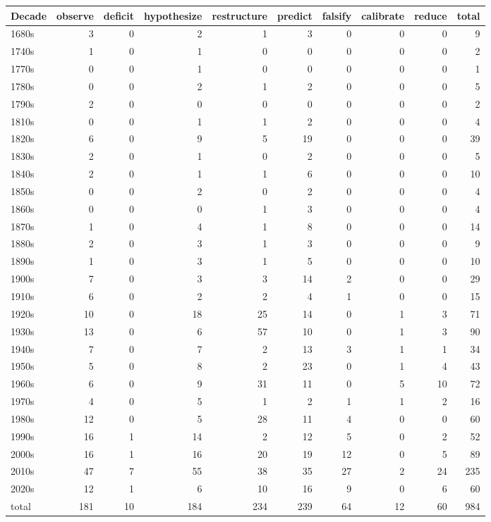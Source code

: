 \begin{tabular}{@{}lrrrrrrrrr@{}}\toprule
Decade & observe & deficit & hypothesize & restructure & predict & falsify & calibrate & reduce & total \\\midrule
1680s & 3 & 0 & 2 & 1 & 3 & 0 & 0 & 0 & 9 \\
1740s & 1 & 0 & 1 & 0 & 0 & 0 & 0 & 0 & 2 \\
1770s & 0 & 0 & 1 & 0 & 0 & 0 & 0 & 0 & 1 \\
1780s & 0 & 0 & 2 & 1 & 2 & 0 & 0 & 0 & 5 \\
1790s & 2 & 0 & 0 & 0 & 0 & 0 & 0 & 0 & 2 \\
1810s & 0 & 0 & 1 & 1 & 2 & 0 & 0 & 0 & 4 \\
1820s & 6 & 0 & 9 & 5 & 19 & 0 & 0 & 0 & 39 \\
1830s & 2 & 0 & 1 & 0 & 2 & 0 & 0 & 0 & 5 \\
1840s & 2 & 0 & 1 & 1 & 6 & 0 & 0 & 0 & 10 \\
1850s & 0 & 0 & 2 & 0 & 2 & 0 & 0 & 0 & 4 \\
1860s & 0 & 0 & 0 & 1 & 3 & 0 & 0 & 0 & 4 \\
1870s & 1 & 0 & 4 & 1 & 8 & 0 & 0 & 0 & 14 \\
1880s & 2 & 0 & 3 & 1 & 3 & 0 & 0 & 0 & 9 \\
1890s & 1 & 0 & 3 & 1 & 5 & 0 & 0 & 0 & 10 \\
1900s & 7 & 0 & 3 & 3 & 14 & 2 & 0 & 0 & 29 \\
1910s & 6 & 0 & 2 & 2 & 4 & 1 & 0 & 0 & 15 \\
1920s & 10 & 0 & 18 & 25 & 14 & 0 & 1 & 3 & 71 \\
1930s & 13 & 0 & 6 & 57 & 10 & 0 & 1 & 3 & 90 \\
1940s & 7 & 0 & 7 & 2 & 13 & 3 & 1 & 1 & 34 \\
1950s & 5 & 0 & 8 & 2 & 23 & 0 & 1 & 4 & 43 \\
1960s & 6 & 0 & 9 & 31 & 11 & 0 & 5 & 10 & 72 \\
1970s & 4 & 0 & 5 & 1 & 2 & 1 & 1 & 2 & 16 \\
1980s & 12 & 0 & 5 & 28 & 11 & 4 & 0 & 0 & 60 \\
1990s & 16 & 1 & 14 & 2 & 12 & 5 & 0 & 2 & 52 \\
2000s & 16 & 1 & 16 & 20 & 19 & 12 & 0 & 5 & 89 \\
2010s & 47 & 7 & 55 & 38 & 35 & 27 & 2 & 24 & 235 \\
2020s & 12 & 1 & 6 & 10 & 16 & 9 & 0 & 6 & 60 \\
\midrule total & 181 & 10 & 184 & 234 & 239 & 64 & 12 & 60 & 984 \\
\bottomrule\end{tabular}
